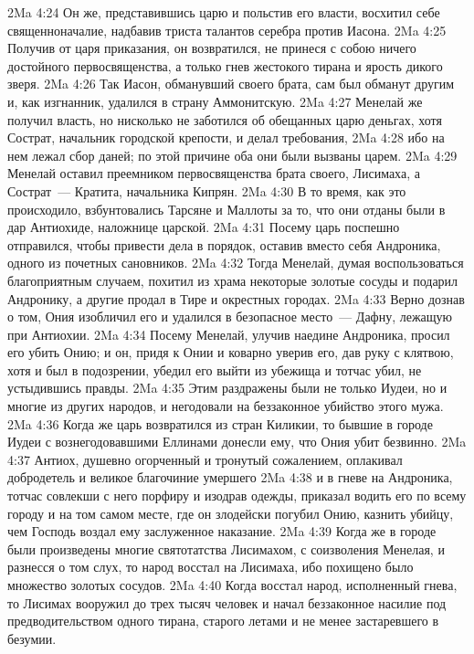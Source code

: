 \vs 2Ma 4:24 Он же, представившись царю и польстив его власти, восхитил себе священноначалие, надбавив триста талантов серебра против Иасона.
\vs 2Ma 4:25 Получив от царя приказания, он возвратился, не принеся с собою ничего достойного первосвященства, а только гнев жестокого тирана и ярость дикого зверя.
\vs 2Ma 4:26 Так Иасон, обманувший своего брата, сам был обманут другим и, как изгнанник, удалился в страну Аммонитскую.
\vs 2Ma 4:27 Менелай же получил власть, но нисколько не заботился об обещанных царю деньгах, хотя Сострат, начальник городской крепости, и делал требования,
\vs 2Ma 4:28 ибо на нем лежал сбор даней; по этой причине оба они были вызваны царем.
\vs 2Ma 4:29 Менелай оставил преемником первосвященства брата своего, Лисимаха, а Сострат~--- Кратита, начальника Кипрян.
\rsbpar\vs 2Ma 4:30 В то время, как это происходило, взбунтовались Тарсяне и Маллоты за то, что они отданы были в дар Антиохиде, наложнице царской.
\vs 2Ma 4:31 Посему царь поспешно отправился, чтобы привести дела в порядок, оставив вместо себя Андроника, одного из почетных сановников.
\vs 2Ma 4:32 Тогда Менелай, думая воспользоваться благоприятным случаем, похитил из храма некоторые золотые сосуды и подарил Андронику, а другие продал в Тире и окрестных городах.
\vs 2Ma 4:33 Верно дознав о том, Ония изобличил его и удалился в безопасное место~--- Дафну, лежащую при Антиохии.
\vs 2Ma 4:34 Посему Менелай, улучив наедине Андроника, просил его убить Онию; и он, придя к Онии и коварно уверив его, дав руку с клятвою, хотя и был в подозрении, убедил его выйти из убежища и тотчас убил, не устыдившись правды.
\vs 2Ma 4:35 Этим раздражены были не только Иудеи, но и многие из других народов, и негодовали на беззаконное убийство этого мужа.
\vs 2Ma 4:36 Когда же царь возвратился из стран Киликии, то бывшие в городе Иудеи с вознегодовавшими Еллинами донесли ему, что Ония убит безвинно.
\vs 2Ma 4:37 Антиох, душевно огорченный и тронутый сожалением, оплакивал добродетель и великое благочиние умершего
\vs 2Ma 4:38 и в гневе на Андроника, тотчас совлекши с него порфиру и изодрав одежды, приказал водить его по всему городу и на том самом месте, где он злодейски погубил Онию, казнить убийцу, чем Господь воздал ему заслуженное наказание.
\rsbpar\vs 2Ma 4:39 Когда же в городе были произведены многие святотатства Лисимахом, с соизволения Менелая, и разнесся о том слух, то народ восстал на Лисимаха, ибо похищено было множество золотых сосудов.
\vs 2Ma 4:40 Когда восстал народ, исполненный гнева, то Лисимах вооружил до трех тысяч человек и начал беззаконное насилие под предводительством одного тирана, старого летами и не менее застаревшего в безумии.
